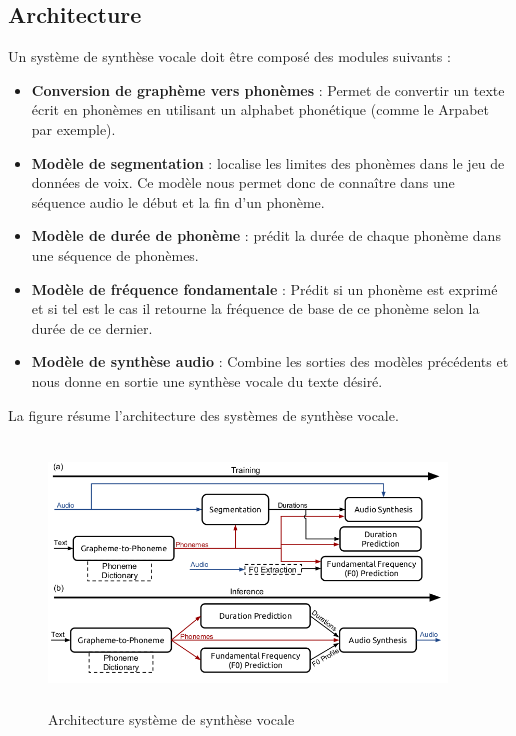 \subsection{Architecture}
Un système de synthèse vocale doit être composé des modules suivants : \cite{textspeechmodules}

\begin{itemize}
    \item \textbf{Conversion de graphème vers phonèmes} : Permet de convertir un texte écrit en phonèmes en utilisant un alphabet phonétique (comme le Arpabet\cite{arpabet} par exemple).
    \item \textbf{Modèle de segmentation} : localise les limites des phonèmes dans le jeu de données de voix. Ce modèle nous permet donc de connaître dans une séquence audio le début et la fin d’un phonème.
    \item \textbf{Modèle de durée de phonème} : prédit la durée de chaque phonème dans une séquence de phonèmes.
    \item \textbf{Modèle de fréquence fondamentale} :  Prédit si un phonème est exprimé et si tel est le cas il retourne la fréquence de base de ce phonème selon la durée de ce dernier.
    \item \textbf{Modèle de synthèse audio} : Combine les sorties des modèles précédents et nous donne en sortie une synthèse vocale du texte désiré.
\end{itemize}

\newpage
La figure résume l'architecture des systèmes de synthèse vocale.

\begin{figure}[H]
    \centering
    \includegraphics[height=200pt,width=300pt]{images/chap1/architecture_tts.png}
    \caption{Architecture système de synthèse vocale\cite{textspeechmodules}}
\end{figure}
